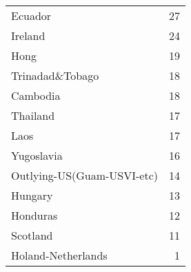 \begin{tabular}{lr}
 Ecuador                    &              27 \\
 Ireland                    &              24 \\
 Hong                       &              19 \\
 Trinadad\&Tobago            &              18 \\
 Cambodia                   &              18 \\
 Thailand                   &              17 \\
 Laos                       &              17 \\
 Yugoslavia                 &              16 \\
 Outlying-US(Guam-USVI-etc) &              14 \\
 Hungary                    &              13 \\
 Honduras                   &              12 \\
 Scotland                   &              11 \\
 Holand-Netherlands         &               1 \\
\bottomrule
\end{tabular}
